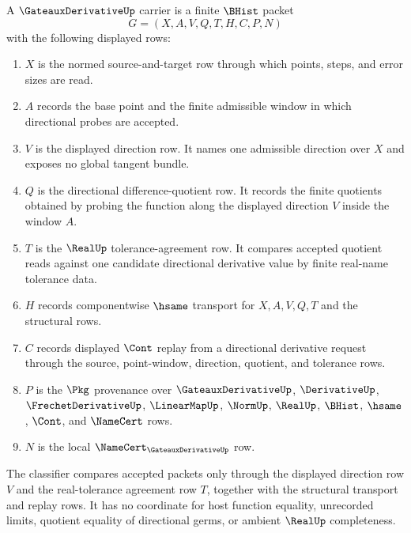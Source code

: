 \begin{definition}
\label{def:gateaux-derivative-carrier}
A $\GateauxDerivativeUp$ carrier is a finite $\BHist$ packet
$$
G=(X,A,V,Q,T,H,C,P,N)
$$
with the following displayed rows:
\begin{enumerate}
\item $X$ is the normed source-and-target row through which points, steps, and error sizes are read.
\item $A$ records the base point and the finite admissible window in which directional probes are accepted.
\item $V$ is the displayed direction row. It names one admissible direction over $X$ and exposes no global tangent bundle.
\item $Q$ is the directional difference-quotient row. It records the finite quotients obtained by probing the function along the displayed direction $V$ inside the window $A$.
\item $T$ is the $\RealUp$ tolerance-agreement row. It compares accepted quotient reads against one candidate directional derivative value by finite real-name tolerance data.
\item $H$ records componentwise $\hsame$ transport for $X,A,V,Q,T$ and the structural rows.
\item $C$ records displayed $\Cont$ replay from a directional derivative request through the source, point-window, direction, quotient, and tolerance rows.
\item $P$ is the $\Pkg$ provenance over $\GateauxDerivativeUp$, $\DerivativeUp$, $\FrechetDerivativeUp$, $\LinearMapUp$, $\NormUp$, $\RealUp$, $\BHist$, $\hsame$, $\Cont$, and $\NameCert$ rows.
\item $N$ is the local $\NameCert_{\GateauxDerivativeUp}$ row.
\end{enumerate}
The classifier compares accepted packets only through the displayed direction row $V$ and the real-tolerance agreement row $T$, together with the structural transport and replay rows. It has no coordinate for host function equality, unrecorded limits, quotient equality of directional germs, or ambient $\RealUp$ completeness.
\end{definition}

